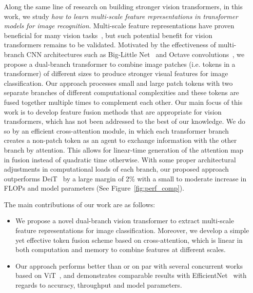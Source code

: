 \documentclass[10pt,twocolumn,letterpaper]{article}
\begin{document}
Along the same line of research on building stronger vision transformers, in this work, we study \textit{how to learn multi-scale feature representations in transformer models for image recognition}. Multi-scale feature representations have proven beneficial for many vision tasks~\cite{chen2018big,cai2016unified,lin2017feature,SKNet_Li_2019_CVPR,hourglass,Deblurring_Nah_2017_CVPR,HigherHRNet_Cheng_2020_CVPR}, but such potential benefit for vision transformers remains to be validated. Motivated by the effectiveness of multi-branch CNN architectures such as Big-Little Net~\cite{chen2018big} and Octave convolutions~\cite{chen2019drop}, we  propose  a  dual-branch  transformer  to  combine image  patches  (i.e. tokens  in  a  transformer)  of  different sizes  to  produce  stronger visual features for image classification. Our approach processes  small and large patch tokens with two separate  branches of different computational complexities and  these  tokens are fused together multiple times to  complement each other. Our main focus of this work is to develop feature fusion methods that are appropriate for vision transformers, which has not been addressed to the best of our knowledge. We do so by an efficient cross-attention module, in which each transformer branch creates a non-patch token as an agent to exchange information with the other branch by attention.  This allows for linear-time  generation  of  the  attention  map  in fusion instead of quadratic time otherwise. With some proper architectural adjustments in computational loads of each branch, our proposed approach outperforms DeiT~\cite{DeiT_touvron2020} by a large margin of 2\% with a small to moderate increase in FLOPs and model parameters (See Figure~\ref{fig:perf_comp}).


The main contributions of our work are as follows:
\begin{itemize}
    \item We propose a novel dual-branch vision transformer to extract multi-scale feature representations for image classification. Moreover, we develop a simple yet effective token fusion scheme based on cross-attention, which is linear in both computation and memory to combine features at different scales. 
\item Our approach performs better than or on par with several concurrent works based on ViT~\cite{ViT_dosovitskiy2021an}, and demonstrates comparable results with EfficientNet~\cite{efficientnet_pmlr_tan_19} with regards to accuracy, throughput and model parameters. \end{itemize}
\end{document}
